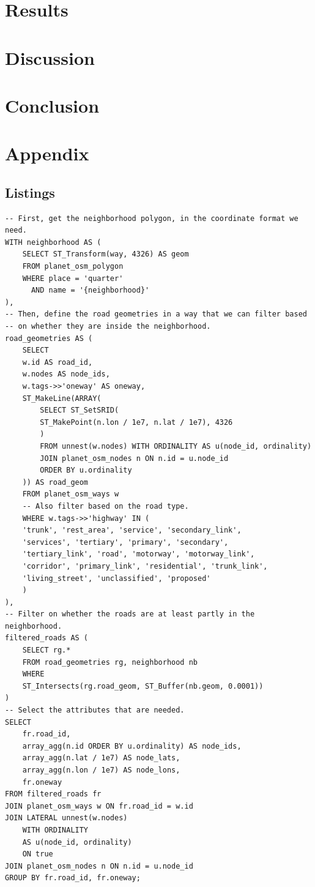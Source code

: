 \documentclass[12pt]{article}
\numberwithin{equation}{section}
\newcommand{\1}[1]{\,I_{#1}} %
\begin{document}
\section{Results}
\section{Discussion}
\section{Conclusion}


\section{Appendix}
\subsection{Listings}
\begin{lstlisting}[caption={The query to extract roads inside a neighborhood.}, label={lst:sql-roads}]
-- First, get the neighborhood polygon, in the coordinate format we need.
WITH neighborhood AS (
    SELECT ST_Transform(way, 4326) AS geom
    FROM planet_osm_polygon
    WHERE place = 'quarter'
      AND name = '{neighborhood}'
),
-- Then, define the road geometries in a way that we can filter based 
-- on whether they are inside the neighborhood.
road_geometries AS (
    SELECT
	w.id AS road_id,
	w.nodes AS node_ids,
	w.tags->>'oneway' AS oneway,
	ST_MakeLine(ARRAY(
	    SELECT ST_SetSRID(
		ST_MakePoint(n.lon / 1e7, n.lat / 1e7), 4326
		)
	    FROM unnest(w.nodes) WITH ORDINALITY AS u(node_id, ordinality)
	    JOIN planet_osm_nodes n ON n.id = u.node_id
	    ORDER BY u.ordinality
	)) AS road_geom
    FROM planet_osm_ways w
    -- Also filter based on the road type.
    WHERE w.tags->>'highway' IN (
	'trunk', 'rest_area', 'service', 'secondary_link',
	'services', 'tertiary', 'primary', 'secondary',
	'tertiary_link', 'road', 'motorway', 'motorway_link', 
	'corridor', 'primary_link', 'residential', 'trunk_link', 
	'living_street', 'unclassified', 'proposed'
    )
),
-- Filter on whether the roads are at least partly in the neighborhood.
filtered_roads AS (
    SELECT rg.*
    FROM road_geometries rg, neighborhood nb
    WHERE
	ST_Intersects(rg.road_geom, ST_Buffer(nb.geom, 0.0001))
)
-- Select the attributes that are needed.
SELECT
    fr.road_id,
    array_agg(n.id ORDER BY u.ordinality) AS node_ids,
    array_agg(n.lat / 1e7) AS node_lats,
    array_agg(n.lon / 1e7) AS node_lons,
    fr.oneway
FROM filtered_roads fr
JOIN planet_osm_ways w ON fr.road_id = w.id
JOIN LATERAL unnest(w.nodes) 
    WITH ORDINALITY 
    AS u(node_id, ordinality) 
    ON true
JOIN planet_osm_nodes n ON n.id = u.node_id
GROUP BY fr.road_id, fr.oneway;
\end{lstlisting}
\end{document}
